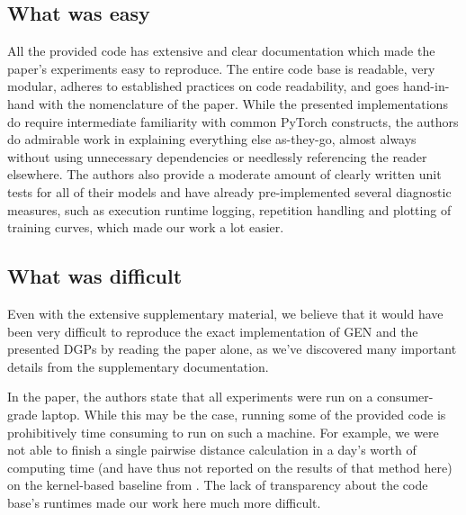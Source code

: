\subsection{What was easy}

All the provided code has extensive and clear documentation which made the paper's experiments easy to reproduce. The entire code base is readable, very modular, adheres to established practices on code readability, and goes hand-in-hand with the nomenclature of the paper. While the presented implementations do require intermediate familiarity with common PyTorch constructs, the authors do admirable work in explaining everything else as-they-go, almost always without using unnecessary dependencies or needlessly referencing the reader elsewhere. The authors also provide a moderate amount of clearly written unit tests for all of their models and have already pre-implemented several diagnostic measures, such as execution runtime logging, repetition handling and plotting of training curves, which made our work a lot easier.



\subsection{What was difficult}

Even with the extensive supplementary material, we believe that it would have been very difficult to reproduce the exact implementation of GEN and the presented DGPs by reading the paper alone, as we've discovered many important details from the supplementary documentation. 

In the paper, the authors state that all experiments were run on a consumer-grade laptop. While this may be the case, running some of the provided code is prohibitively time consuming to run on such a machine. For example, we were not able to finish a single pairwise distance calculation in a day's worth of computing time (and have thus not reported on the results of that method here) on  the kernel-based baseline from \cite{paassen2018time}. The lack of transparency about the code base's runtimes made our work here much more difficult.

